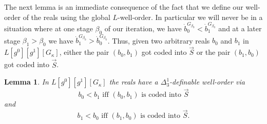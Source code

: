 \documentclass[a4paper,11pt]{article}
\newtheorem{lemma}[theorem]{Lemma}
\begin{document}
The next lemma is an immediate consequence of the fact that we define our well-order of the reals using the global $L$-well-order. In particular we will never be in a situation where at one stage $\beta_0$ of our iteration, we have $\dot{b}_0^{G_{\beta_0}} < \dot{b}_1^{G_{\beta_0}}$ and at a later stage $\beta_1 > \beta_0$ we have 
$\dot{b}_1^{G_{\beta_0}} > \dot{b}_0^{G_{\beta_0}}$. Thus, given two arbitrary reals $b_0$ and $b_1$ in $L [g^0][g^1][G_{\kappa}]$, either the pair $(b_0,b_1)$ got coded into $\vec{S}$ or the pair $(b_1,b_0)$ got coded into $\vec{S}$.
\begin{lemma}
In $L[g^0][g^1][G_{\kappa}]$ the reals have a $\Delta^1_3$-definable well-order via
\[ \text{$b_0 < b_1$ iff $(b_0,b_1)$ is coded into $\vec{S}$} \]
and
\[  \text{$b_1 < b_0$ iff $(b_1,b_0)$ is coded into $\vec{S}$}. \]
\end{lemma}
\end{document}
